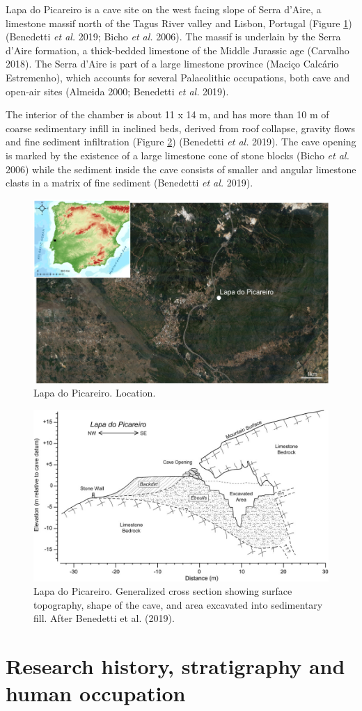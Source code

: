 \documentclass[12pt,twoside]{reedthesis}
\begin{document}
Lapa do Picareiro is a cave site on the west facing slope of Serra d'Aire, a limestone massif north of the Tagus River valley and Lisbon, Portugal (Figure \ref{fig:lpmap}) (Benedetti \emph{et al.} 2019; Bicho \emph{et al.} 2006). The massif is underlain by the Serra d'Aire formation, a thick-bedded limestone of the Middle Jurassic age (Carvalho 2018). The Serra d'Aire is part of a large limestone province (Maciço Calcário Estremenho), which accounts for several Palaeolithic occupations, both cave and open-air sites (Almeida 2000; Benedetti \emph{et al.} 2019).

The interior of the chamber is about 11 x 14 m, and has more than 10 m of coarse sedimentary infill in inclined beds, derived from roof collapse, gravity flows and fine sediment infiltration (Figure \ref{fig:lpcave}) (Benedetti \emph{et al.} 2019). The cave opening is marked by the existence of a large limestone cone of stone blocks (Bicho \emph{et al.} 2006) while the sediment inside the cave consists of smaller and angular limestone clasts in a matrix of fine sediment (Benedetti \emph{et al.} 2019).
\begin{figure}

{\centering \includegraphics[width=0.6\linewidth]{figure/picareiro_map} 

}

\caption{Lapa do Picareiro. Location.}\label{fig:lpmap}
\end{figure}
\begin{figure}[H]

{\centering \includegraphics[width=0.6\linewidth]{figure/lp_cross_section} 

}

\caption{Lapa do Picareiro. Generalized cross section showing surface topography, shape of the cave, and area excavated into sedimentary fill. After Benedetti et al. (2019).}\label{fig:lpcave}
\end{figure}
\hypertarget{research-history-stratigraphy-and-human-occupation}{%
\section{Research history, stratigraphy and human occupation}\label{research-history-stratigraphy-and-human-occupation}}
\end{document}
